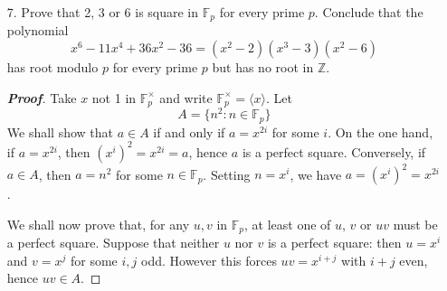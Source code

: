 \documentclass[12pt,leqno]{article}
\theoremstyle{definition}
\newcommand{\Z}{\mathbb{Z}}
\newcommand{\F}{\mathbb{F}}
\newcommand{\+}{\oplus}
\newenvironment{Proof}{\begin{proof}[\textnormal{\textbf{Proof}}]}{\end{proof}}
\newenvironment{Solution}{\begin{proof}[\textnormal{\textbf{Solution}}]}{\end{proof}}
\begin{document}
\begin{enumerate}
\begin{Solution}
    \end{Solution}
   \item [7.] Prove that 2, 3 or 6 is square in $\F_p$ for every prime $p$. Conclude that the polynomial \[x^6-11x^4+36x^2-36=(x^2-2)(x^3-3)(x^2-6)\] has root modulo $p$ for every prime $p$ but has no root in $\Z$.
    \begin{Proof}
     Take $x$ not 1 in $\F_p^{\times}$ and write $\F_p^{\times}=\langle x\rangle$. Let \[A=\{n^2:n\in\F_p\}\] We shall show that $a\in A$ if and only if $a=x^{2i}$ for some $i$. On the one hand, if $a=x^{2i}$, then $\left(x^i\right)^2=x^{2i}=a$, hence $a$ is a perfect square. Conversely, if $a\in A$, then $a=n^2$ for some $n\in\F_p$. Setting $n=x^i$, we have $a=\left(x^i\right)^2=x^{2i}$. 

We shall now prove that, for any $u,v$ in $\F_p$, at least one of $u$, $v$ or $uv$ must be a perfect square. Suppose that neither $u$ nor $v$ is a perfect square: then $u=x^i$ and $v=x^j$ for some $i,j$ odd. However this forces $uv=x^{i+j}$ with $i+j$ even, hence $uv\in A$. 


\end{Proof}
\end{enumerate}
\end{document}
